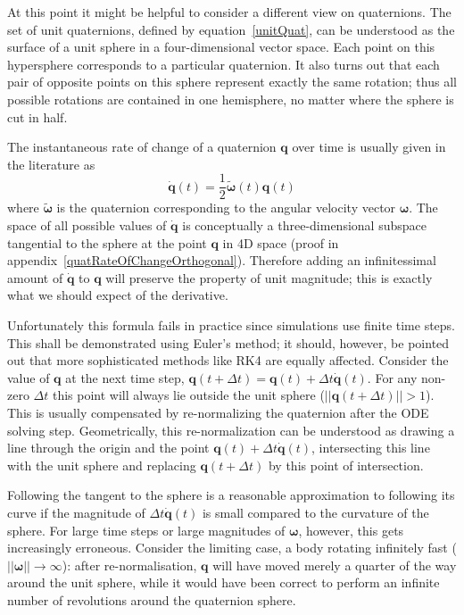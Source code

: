 At this point it might be helpful to consider a different view on quaternions. The set of
unit quaternions, defined by equation~\ref{unitQuat}, can be understood as the surface of
a unit sphere in a four-dimensional vector space. Each point on this hypersphere corresponds
to a particular quaternion. It also turns out that each pair of opposite points on this
sphere represent exactly the same rotation; thus all possible rotations are contained in
one hemisphere, no matter where the sphere is cut in half.

The instantaneous rate of change of a quaternion $\mathbf{q}$ over time is usually given
in the literature as
\begin{equation}
\label{quatRateOfChange}
\dot{\mathbf{q}}(t) = \frac{1}{2}\tilde{\bm{\omega}}(t)\mathbf{q}(t)
\end{equation}
where $\tilde{\bm{\omega}}$ is the quaternion corresponding to the angular velocity
vector $\bm{\omega}$. The space of all possible values of $\dot{\mathbf{q}}$ is
conceptually a three-dimensional subspace tangential to the sphere at the point $\mathbf{q}$
in 4D space (proof in appendix~\ref{quatRateOfChangeOrthogonal}). Therefore adding an
infinitessimal amount of $\dot{\mathbf{q}}$ to $\mathbf{q}$ will preserve the property of
unit magnitude; this is exactly what we should expect of the derivative.

Unfortunately this formula fails in practice since simulations use finite time steps. This
shall be demonstrated using Euler's method; it should, however, be pointed out that more
sophisticated methods like RK4 are equally affected. Consider the value of $\mathbf{q}$ at
the next time step, $\mathbf{q}(t + \Delta t) = \mathbf{q}(t) + \Delta t \dot{\mathbf{q}}(t)$.
For any non-zero $\Delta t$ this point will always lie outside the unit sphere
($||\mathbf{q}(t + \Delta t)|| > 1$). This is usually compensated by re-normalizing the
quaternion after the ODE solving step. Geometrically, this re-normalization can be understood as
drawing a line through the origin and the point $\mathbf{q}(t) + \Delta t \dot{\mathbf{q}}(t)$,
intersecting this line with the unit sphere and replacing $\mathbf{q}(t + \Delta t)$ by this
point of intersection.

Following the tangent to the sphere is a reasonable approximation to following its curve if the
magnitude of $\Delta t \dot{\mathbf{q}}(t)$ is small compared to the curvature of the sphere.
For large time steps or large magnitudes of $\bm{\omega}$, however, this gets increasingly
erroneous. Consider the limiting case, a body rotating infinitely fast
($||\bm{\omega}|| \rightarrow \infty$): after re-normalisation, $\mathbf{q}$ will have moved merely
a quarter of the way around the unit sphere, while it would have been correct to perform an
infinite number of revolutions around the quaternion sphere.

